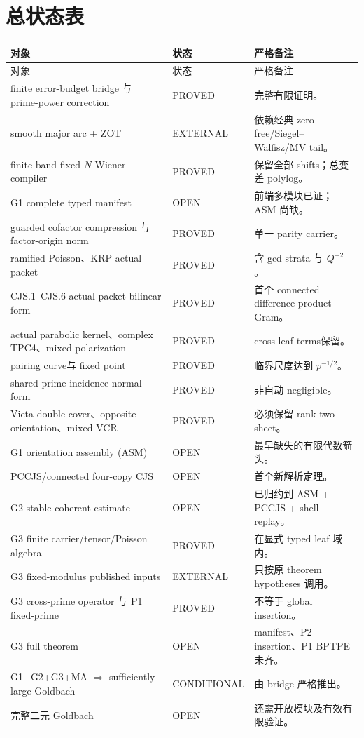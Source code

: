 \documentclass[11pt,a4paper]{ctexart}
\theoremstyle{definition}
\newcommand{\1}{\mathbf 1}
\newcommand{\PROVED}{\textcolor{green!40!black}{\textsf{PROVED}}}
\newcommand{\EXTERNAL}{\textcolor{blue!65!black}{\textsf{EXTERNAL}}}
\newcommand{\CONDITIONAL}{\textcolor{orange!75!black}{\textsf{CONDITIONAL}}}
\newcommand{\OPEN}{\textcolor{red!70!black}{\textsf{OPEN}}}
\begin{document}
\section{总状态表}
\label{sec:status}

\begin{longtable}{p{}p{}p{}}
\toprule
对象&状态&严格备注\\ \midrule
\endfirsthead
\toprule 对象&状态&严格备注\\ \midrule\endhead
finite error-budget bridge 与 prime-power correction&\PROVED&完整有限证明。\\
smooth major arc + ZOT&\EXTERNAL&依赖经典 zero-free/Siegel--Walfisz/MV tail。\\
finite-band fixed-$N$ Wiener compiler&\PROVED&保留全部 shifts；总变差 polylog。\\
G1 complete typed manifest&\OPEN&前端多模块已证；ASM 尚缺。\\
guarded cofactor compression 与 factor-origin norm&\PROVED&单一 parity carrier。\\
ramified Poisson、KRP actual packet&\PROVED&含 gcd strata 与 $Q^{-2}$。\\
CJS.1--CJS.6 actual packet bilinear form&\PROVED&首个 connected difference-product Gram。\\
actual parabolic kernel、complex TPC4、mixed polarization&\PROVED&cross-leaf terms保留。\\
pairing curve与 fixed point&\PROVED&临界尺度达到 $p^{-1/2}$。\\
shared-prime incidence normal form&\PROVED&非自动 negligible。\\
Vieta double cover、opposite orientation、mixed VCR&\PROVED&必须保留 rank-two sheet。\\
G1 orientation assembly (ASM)&\OPEN&最早缺失的有限代数箭头。\\
PCCJS/connected four-copy CJS&\OPEN&首个新解析定理。\\
G2 stable coherent estimate&\OPEN&已归约到 ASM + PCCJS + shell replay。\\
G3 finite carrier/tensor/Poisson algebra&\PROVED&在显式 typed leaf 域内。\\
G3 fixed-modulus published inputs&\EXTERNAL&只按原 theorem hypotheses 调用。\\
G3 cross-prime operator 与 P1 fixed-prime&\PROVED&不等于 global insertion。\\
G3 full theorem&\OPEN&manifest、P2 insertion、P1 BPTPE 未齐。\\
G1+G2+G3+MA $\Rightarrow$ sufficiently-large Goldbach&\CONDITIONAL&由 bridge 严格推出。\\
完整二元 Goldbach&\OPEN&还需开放模块及有效有限验证。\\
\bottomrule
\end{longtable}
\end{document}
